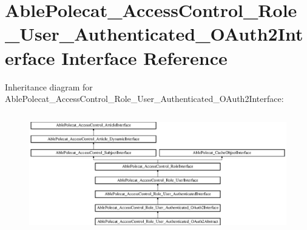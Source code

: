 \hypertarget{interface_able_polecat___access_control___role___user___authenticated___o_auth2_interface}{}\section{Able\+Polecat\+\_\+\+Access\+Control\+\_\+\+Role\+\_\+\+User\+\_\+\+Authenticated\+\_\+\+O\+Auth2\+Interface Interface Reference}
\label{interface_able_polecat___access_control___role___user___authenticated___o_auth2_interface}
Inheritance diagram for Able\+Polecat\+\_\+\+Access\+Control\+\_\+\+Role\+\_\+\+User\+\_\+\+Authenticated\+\_\+\+O\+Auth2\+Interface\+:\begin{figure}[H]
\begin{center}
\leavevmode
\includegraphics[height=5.245902cm]{interface_able_polecat___access_control___role___user___authenticated___o_auth2_interface}
\end{center}
\end{figure}
